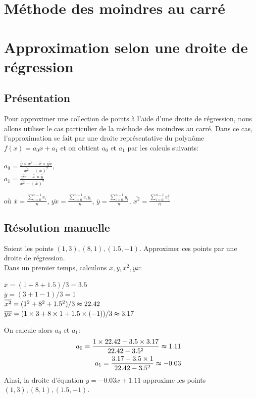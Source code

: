 \section{Méthode des moindres au carré}
\section{Approximation selon une droite de régression}
\subsection{Présentation}
Pour approximer une collection de points à l'aide d'une droite de régression, nous allons utiliser le cas particulier de la méthode des moindres au carré. Dans ce cas, l'approximation se fait par une droite représentative du polynôme $f(x)=a_0x+a_1$ et on obtient $a_0$ et $a_1$ par les calculs suivants:\vspace{6pt}\\
\begin{center}
        $a_0=\frac{\overline{y}\times\overline{x^2}-\overline{x}\times\overline{yx}}{\overline{x^2}-(\overline{x})^2},$\vspace{5pt}\\
        $a_1=\frac{\overline{yx}-\overline{x}\times\overline{y}}{\overline{x^2}-(\overline{x})^2}$
\end{center}
où $\overline{x}=\frac{\sum\limits_{i=0}^{n-1}x_i}{n}$, $\overline{yx}=\frac{\sum\limits_{i=0}^{n-1}x_iy_i}{n}$, $\overline{y}=\frac{\sum\limits_{i=0}^{n-1}y_i}{n}$, $\overline{x^2}=\frac{\sum\limits_{i=0}^{n-1}x_i^2}{n}$\vspace{4pt}\\
\subsection{Résolution manuelle}
Soient les points $(1,3), (8,1), (1.5, -1)$. Approximer ces points par une droite de régression.\\
Dans un premier temps, calculons $\overline{x}, \overline{y}, \overline{x^2}, \overline{yx}$:\\
\begin{center}
$\overline{x}=(1+8+1.5)/3=3.5$\vspace{3pt}\\
$\overline{y}=(3+1-1)/3=1$\vspace{3pt}\\
$\overline{x^2}=(1^2+8^2+1.5^2)/3\thickapprox22.42$\vspace{3pt}\\
$\overline{yx}=(1\times3+8\times1+1.5\times(-1))/3\thickapprox3.17$\vspace{3pt}\\
\end{center}
On calcule alors $a_0$ et $a_1$:\\
\begin{align*}
    a_0=\frac{1\times22.42-3.5\times3.17}{22.42-3.5^2}\thickapprox1.11\vspace{5pt}\\
    a_1=\frac{3.17-3.5\times1}{22.42-3.5^2}\thickapprox -0.03
\end{align*}
Ainsi, la droite d'équation $y=-0.03x+1.11$ approxime les points $(1,3), (8,1), (1.5, -1)$.
\newpage
